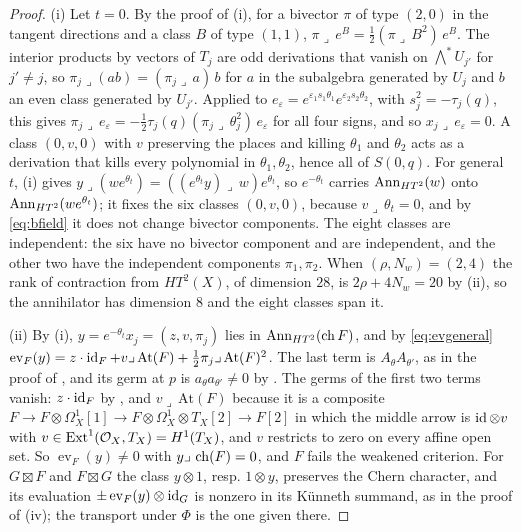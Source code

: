 \begin{proof}
(i) Let $t=0$. By the proof of (i), for a bivector $\pi$
of type $(2,0)$ in the tangent directions and a class $B$ of type $(1,1)$,
$\pi\lrcorner\,e^{B}=\tfrac12(\pi\lrcorner\,B^{2})\,e^{B}$. The interior
products by vectors of $T_{j}$ are odd derivations that vanish on
$\bigwedge^{*}U_{j'}$ for $j'\ne j$, so $\pi_{j}\lrcorner(ab)=(\pi_{j}\lrcorner\,a)\,b$
for $a$ in the subalgebra generated by $U_{j}$ and $b$ an even class
generated by $U_{j'}$. Applied to
$e_{\varepsilon}=e^{\varepsilon_{1}s_{1}\theta_{1}}e^{\varepsilon_{2}s_{2}\theta_{2}}$,
with $s_{j}^{2}=-\tau_{j}(q)$, this gives
$\pi_{j}\lrcorner\,e_{\varepsilon}=-\tfrac12\tau_{j}(q)(\pi_{j}\lrcorner\,\theta_{j}^{2})\,e_{\varepsilon}$
for all four signs, and so $x_{j}\lrcorner\,e_{\varepsilon}=0$. A class
$(0,v,0)$ with $v$ preserving the places and killing $\theta_{1}$ and
$\theta_{2}$ acts as a derivation that kills every polynomial in
$\theta_{1},\theta_{2}$, hence all of $S(0,q)$. For general $t$,
(i) gives $y\lrcorner(we^{\theta_{t}})=((e^{\theta_{t}}y)\lrcorner\,w)e^{\theta_{t}}$,
so $e^{-\theta_{t}}$ carries $\operatorname{Ann}_{HT^{2}}(w)$ onto
$\operatorname{Ann}_{HT^{2}}(we^{\theta_{t}})$; it fixes the six classes $(0,v,0)$,
because $v\lrcorner\,\theta_{t}=0$, and by \eqref{eq:bfield} it does not
change bivector components. The eight classes are independent: the six have
no bivector component and are independent, and the other two have the
independent components $\pi_{1},\pi_{2}$. When $(\rho,N_{w})=(2,4)$ the rank
of contraction from $HT^{2}(X)$, of dimension $28$, is $2\rho+4N_{w}=20$ by
(ii), so the annihilator has dimension $8$ and the
eight classes span it.

(ii) By (i), $y=e^{-\theta_{t}}x_{j}=(z,v,\pi_{j})$ lies in
$\operatorname{Ann}_{HT^{2}}(\operatorname{ch} F)$, and by \eqref{eq:evgeneral}
$\operatorname{ev}_{F}(y)=z\cdot\operatorname{id}_{F}+v\lrcorner\,\mathrm{At}(F)
+\tfrac12\pi_{j}\lrcorner\,\mathrm{At}(F)^{2}$. The last term is
$A_{\theta}A_{\theta'}$, as in the proof of , and its
germ at $p$ is $a_{\theta}a_{\theta'}\ne0$ by . The germs of the
first two terms vanish: $z\cdot\operatorname{id}_{F}$ by , and
$v\lrcorner\,\mathrm{At}(F)$ because it is a composite
$F\to F\otimes\Omega^{1}_{X}[1]\to F\otimes\Omega^{1}_{X}\otimes T_{X}[2]\to F[2]$
in which the middle arrow is $\operatorname{id}\otimes v$ with
$v\in\operatorname{Ext}^{1}(\mathcal{O}_{X},T_{X})=H^{1}(T_{X})$, and $v$ restricts to zero on
every affine open set. So $\operatorname{ev}_{F}(y)\ne0$ with
$y\lrcorner\,\operatorname{ch}(F)=0$, and $F$ fails the weakened criterion. For
$G\boxtimes F$ and $F\boxtimes G$ the class $y\otimes1$, resp. $1\otimes y$,
preserves the Chern character, and its evaluation
$\pm\operatorname{ev}_{F}(y)\otimes\operatorname{id}_{G}$ is nonzero in its K\"unneth
summand, as in the proof of (iv); the transport under
$\Phi$ is the one given there.


\end{proof}
